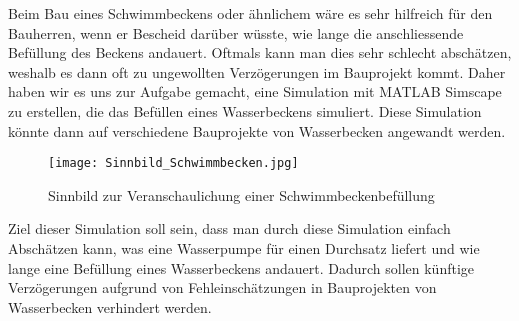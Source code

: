 Beim Bau eines Schwimmbeckens oder ähnlichem wäre es sehr hilfreich für den 	Bauherren, wenn er Bescheid darüber wüsste, wie lange die anschliessende 		Befüllung des Beckens andauert. Oftmals kann man dies sehr schlecht 			abschätzen, weshalb es dann oft zu ungewollten Verzögerungen im 				Bauprojekt kommt. Daher haben wir es uns zur Aufgabe gemacht, eine 				Simulation mit MATLAB Simscape zu erstellen, die das Befüllen eines 			Wasserbeckens simuliert. Diese Simulation könnte dann auf verschiedene 			Bauprojekte von Wasserbecken angewandt werden.

\begin{figure}[htb]
\texttt{[image: Sinnbild\_Schwimmbecken.jpg]}
\caption{Sinnbild zur Veranschaulichung einer Schwimmbeckenbefüllung}
\label{fig:Sinnbild zur Veranschaulichung einer Schwimmbeckenbefüllung}
\end{figure}

Ziel dieser Simulation soll sein, dass man durch diese Simulation einfach Abschätzen kann, was eine Wasserpumpe für einen Durchsatz liefert und wie lange eine Befüllung eines Wasserbeckens andauert. Dadurch sollen künftige Verzögerungen aufgrund von Fehleinschätzungen in Bauprojekten von 				Wasserbecken verhindert werden.